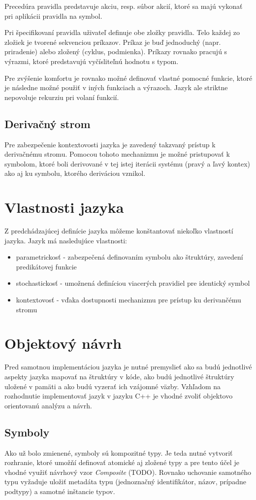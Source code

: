Precedúra pravidla predstavuje akciu, resp. súbor akcií, ktoré sa majú vykonať pri aplikácii pravidla na symbol. 

Pri špecifikovaní pravidla uživateľ definuje obe zložky pravidla. Telo každej zo zložiek je tvorené sekvenciou príkazov. Príkaz je buď jednoduchý (napr. priradenie) alebo zložený (cyklus, podmienka). Príkazy rovnako pracujú s výrazmi, ktoré predstavujú vyčísliteľnú hodnotu s typom.

Pre zvýšenie komfortu je rovnako možné definovať vlastné pomocné funkcie, ktoré je následne možné použiť v iných funkciach a výrazoch. 
Jazyk ale striktne nepovoluje rekurziu pri volaní funkcií.

\subsection{Derivačný strom}
Pre zabezpečenie kontextovosti jazyka je zavedený takzvaný prístup k derivačnému stromu. Pomocou tohoto mechanizmu je možné pristupovať k symbolom, ktoré boli derivované v tej istej iterácii systému (pravý a ľavý kontex) ako aj ku symbolu, ktorého deriváciou vznikol. 

\section{Vlastnosti jazyka}
Z predchádzajúcej definície jazyka môžeme konštantovať niekoľko vlastností jazyka. Jazyk má nasledujúce vlastnosti:
\begin{itemize}
\item parametrickosť - zabezpečená definovaním symbolu ako štruktúry, zavedení predikátovej funkcie
\item stochastickosť - umožnená definíciou viacerých pravidiel pre identický symbol
\item kontextovosť - vďaka dostupnosti mechanizmu pre prístup ku derivančému stromu
\end{itemize}

\section{Objektový návrh}
Pred samotnou implementáciou jazyka je nutné premyslieť ako sa budú jednotlivé aspekty jazyka mapovať na štruktúry v kóde, ako budú jednotlivé štruktúry uložené v pamäti a ako budú vyzerať ich vzájomné väzby. Vzhľadom na rozhodnutie implementovať jazyk v jazyku C++ je vhodné zvoliť objektovo orientovanú analýzu a návrh. 
\subsection{Symboly}
Ako už bolo zmienené, symboly sú kompozitné typy. Je teda nutné vytvoriť rozhranie, ktoré umožňí definovať atomické aj zložené typy a pre tento účel je vhodné využiť návrhový vzor \textit{Composite} (TODO).  Rovnako uchovanie samotného typu vyžaduje uložiť metadáta typu (jednoznačný identifikátor, názov, prípadne podtypy) a samotné inštancie typov. 

